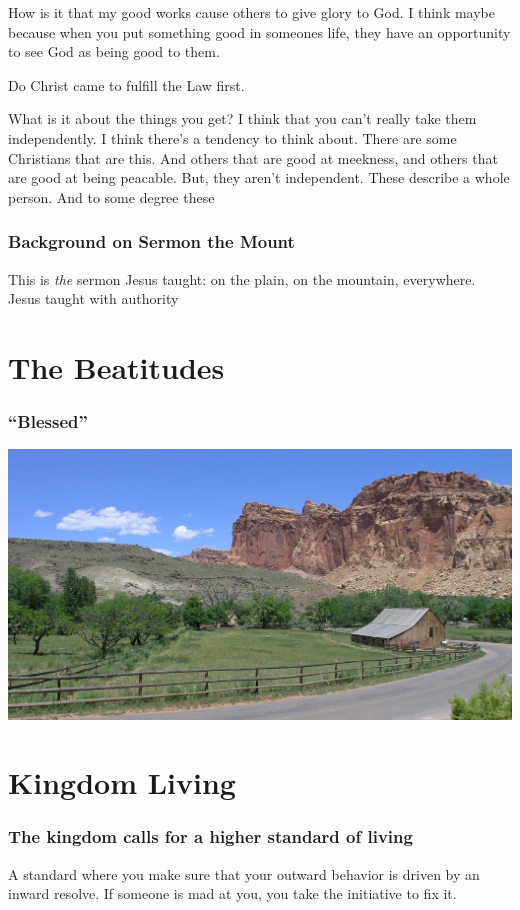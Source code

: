 {How is it that my good works cause others to give glory to God.  I think maybe because when you put something good in someones life, they have an opportunity to see God as being good to them.

Do Christ came to fulfill the Law first.


What is it about the things you get?
I think that you can't really take them independently.
I think there's a tendency to think about.  There are some Christians that are this.  And others that are good at meekness, and others that are good at being peacable.  But, they aren't independent.  These describe a whole person.
And to some degree these 
}

\begin{frame}
\frametitle{Background on Sermon the Mount}
This is \emph{the} sermon Jesus taught: on the plain, on the mountain, everywhere.
Jesus taught with authority
\end{frame}

\begin{frame}
\frametitle{\insertlecture}
\tableofcontents[sectionstyle=show/show]
\end{frame}

\section{The Beatitudes}

\begin{frame}
\frametitle{``Blessed''}
\includegraphics[width=\textwidth]{graphics/ranch.jpeg}
\end{frame}

\section{Kingdom Living}

\begin{frame}
\frametitle{The kingdom calls for a higher standard of living}
A standard where you make sure that your outward behavior is driven by an inward resolve.
If someone is mad at you, you take the initiative to fix it.
\end{frame}

